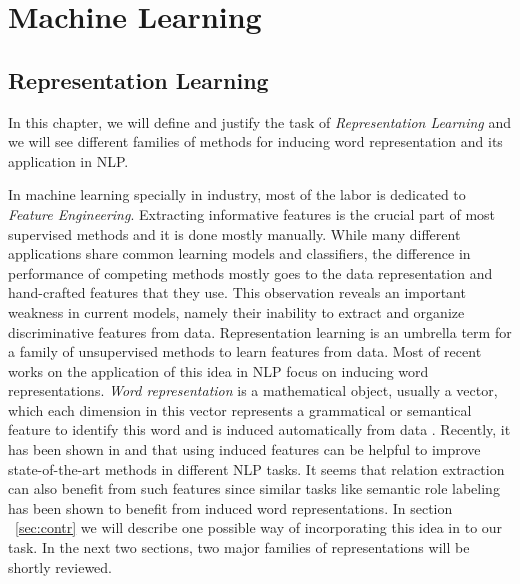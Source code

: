 \chapter{Machine Learning}

\section{Representation Learning}
\label {ch:repr-learning}

In this chapter, we will define and justify the task of
\emph{Representation Learning} and we will see different families of methods for
inducing word representation and its application in NLP.

In machine learning specially in industry, most of the labor is dedicated to
\emph{Feature Engineering}. Extracting informative features is the crucial part
of most supervised methods and it is done mostly manually. While many different
applications share common learning models and classifiers, the difference in
performance of competing methods mostly goes to the data representation and
hand-crafted features that they use. This observation reveals an important
weakness in current models, namely their inability to extract and organize
discriminative features from data. Representation learning is an umbrella term
for a family of unsupervised methods to learn features from data. Most of recent
works on the application of this idea in NLP focus on inducing word
representations. \emph{Word representation} is a mathematical object, usually a
vector, which each dimension in this vector represents a grammatical or
semantical feature to identify this word and is induced automatically from data
\cite{Turian2010b}. Recently, it has been shown in \cite{Turian2010b} and \cite{Collobert2011} that using
 induced features can be helpful to improve state-of-the-art methods in 
different NLP tasks. It seems that relation extraction can also benefit from such features since similar tasks like 
semantic role labeling has been shown to benefit from
induced word representations. In section ~\ref{sec:contr} we will describe one
possible way of incorporating this idea in to our task. In the next two sections, two major
families of representations will be shortly reviewed.



